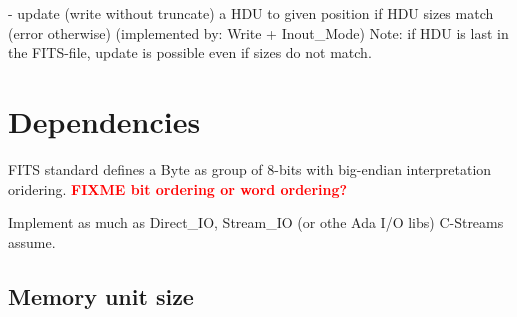 \documentclass[a4paper,10pt]{article}
\newcommand{\fixme}[1]{\textbf{\textcolor{red}{FIXME #1}}}
\begin{document}
- update (write without truncate) a HDU to given 
position if HDU sizes match (error otherwise)
(implemented by: Write + Inout_Mode)
Note: if HDU is last in the FITS-file, 
update is possible even if sizes do not match.


%

\section{Dependencies}

FITS standard defines a Byte as group of 8-bits with big-endian 
interpretation oridering. \fixme{bit ordering or word ordering?}

Implement as much as Direct\_IO, Stream\_IO (or othe Ada I/O libs) C-Streams assume.

\subsection{Memory unit size}
\end{document}
